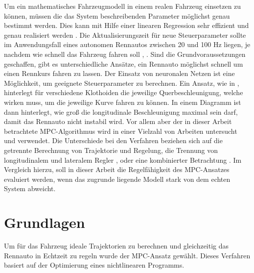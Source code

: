 \documentclass{like}
\begin{document}
Um ein mathematisches Fahrzeugmodell in einem realen Fahrzeug einsetzen zu können, müssen die das System beschreibenden Parameter möglichst genau bestimmt werden. Dies kann mit Hilfe einer linearen Regression sehr effizient und genau realisiert werden \cite{Williams2016AggressiveDW}. Die Aktualisierungszeit für neue Steuerparameter sollte im Anwendungsfall eines autonomen Rennautos zwischen 20 und 100 Hz liegen, je nachdem wie schnell das Fahrzeug fahren soll \cite{rc_car_1_43}, \cite{Williams2016AggressiveDW}. 
\newline
Sind die Grundvoraussetzungen geschaffen, gibt es unterschiedliche Ansätze, ein Rennauto möglichst schnell um einen Rennkurs fahren zu lassen. Der Einsatz von neuronalen Netzen \cite{6374146} ist eine Möglichkeit, um geeignete Steuerparameter zu berechnen. 
Ein Ansatz, wie in \cite{KRITAYAKIRANA2010548}, hinterlegt für verschiedene Klothoiden die jeweilige Querbeschleunigung, welche wirken muss, um die jeweilige Kurve fahren zu können. In einem Diagramm ist dann hinterlegt, wie groß die longitudinale Beschleunigung maximal sein darf, damit das Rennauto nicht instabil wird. Vor allem aber der in dieser Arbeit betrachtete \ac{MPC}-Algorithmus wird in einer Vielzahl von Arbeiten untersucht und verwendet. 
Die Unterschiede bei den Verfahren beziehen sich auf die getrennte Berechnung von Trajektorie und Regelung, die Trennung von longitudinalem und lateralem Regler \cite{MPC_Dynamic}, \cite{MPC_Dynamic_Tire_Model} oder eine kombinierter Betrachtung \cite{rc_car_1_43}. Im Vergleich hierzu, soll in dieser Arbeit die Regelfähigkeit des \ac{MPC}-Ansatzes evaluiert werden, wenn das zugrunde liegende Modell stark von dem echten System abweicht.


\chapter{Grundlagen}
Um für das Fahrzeug ideale Trajektorien zu berechnen und gleichzeitig das Rennauto in Echtzeit zu regeln wurde der \ac{MPC}-Ansatz gewählt. Dieses Verfahren basiert auf der Optimierung eines nichtlinearen Programms.
 
\end{document}

